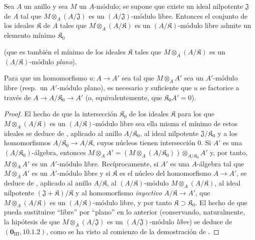 \begin{corollary}[11.4.4]
\label{IV.11.4.4}
Sea $A$ un anillo y sea $M$ un $A$-módulo; se supone que existe
un ideal nilpotente $\mathfrak J$ de $A$ tal que $M\otimes_A(A/\mathfrak J)$ es un $(A/\mathfrak J)$-módulo libre. Entonces el conjunto de los
ideales $\mathfrak K$ de $A$ tales que $M\otimes_A(A/\mathfrak K)$ es un $(A/\mathfrak K)$-módulo libre admite un elemento mínimo $\mathfrak K_0$

\textup{(que es también el mínimo de los ideales $\mathfrak K$ tales que $M\otimes_A(A/\mathfrak K)$ es un $(A/\mathfrak K)$-módulo \emph{plano})}.






Para que un homomorfismo $u:A\to A'$ sea tal que $M\otimes_A A'$ sea un $A'$-módulo libre \textup{(resp.}\ un
$A'$-módulo plano), es necesario y suficiente que $u$ se factorice a través de $A\to A/\mathfrak K_0\to A'$ (o, equivalentemente, que $\mathfrak K_0A'=0$).

\end{corollary}

\begin{proof}
El hecho de que la intersección $\mathfrak K_0$ de los ideales $\mathfrak K$ para los que $M\otimes_A(A/\mathfrak K)$ es un
$(A/\mathfrak K)$-módulo libre sea ella misma el mínimo de estos ideales se deduce de , aplicado al
anillo $A/\mathfrak K_0$, al ideal nilpotente $\mathfrak J/\mathfrak K_0$ y a los homomorfismos $A/\mathfrak K_0\to A/\mathfrak K$,
cuyos núcleos tienen intersección $0$. Si $A'$ es una $(A/\mathfrak K_0)$-álgebra, entonces
$M\otimes_A A'=
(M\otimes_A(A/\mathfrak K_0))\otimes_{A/\mathfrak K_0}A'$ y, por tanto, $M\otimes_A A'$ es un $A'$-módulo libre. Recíprocamente, si $A'$ es una $A$-álgebra tal que $M\otimes_A A'$ es un $A'$-módulo libre y si $\mathfrak K$ es el núcleo
del homomorfismo $A\to A'$, se deduce de , aplicado al anillo $A/\mathfrak K$, al
$(A/\mathfrak K)$-módulo $M\otimes_A(A/\mathfrak K)$, al ideal nilpotente $(\mathfrak J+\mathfrak K)/\mathfrak K$ y al homomorfismo \emph{inyectivo}
$A/\mathfrak K\to A'$, que $M\otimes_A(A/\mathfrak K)$ es un $(A/\mathfrak K)$-módulo libre, y por tanto $\mathfrak K\supset\mathfrak K_0$. El hecho de que
pueda sustituirse ``libre'' por ``plano'' en lo anterior (conservando, naturalmente,
la hipótesis de que $M\otimes_A(A/\mathfrak J)$ es un $(A/\mathfrak J)$-módulo \emph{libre}) se deduce de $(\mathbf 0_{\mathrm{III}},10.1.2)$,
como se ha visto al comienzo de la demostración de .
\end{proof}


